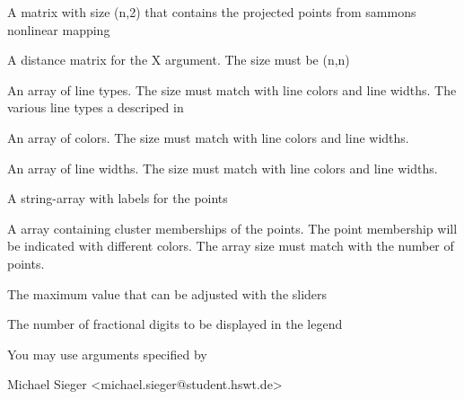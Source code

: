 \documentclass[letterpaper]{book}
\begin{document}
\begin{Arguments}
\begin{ldescription}
\item[\code{X}] 
A matrix with size (n,2) that contains the projected points from sammons nonlinear mapping

\item[\code{D}] 
A distance matrix for the X argument. The size must be (n,n)

\item[\code{linetypes}] 
An array of line types. The size must match with line colors and line widths.
The various line types a descriped in 

\item[\code{linecolors}] 
An array of colors. The size must match with line colors and line widths.

\item[\code{linewidths}] 
An array of line widths. The size must match with line colors and line widths.

\item[\code{labels}] 
A string-array with labels for the points

\item[\code{cluster}] 
A array containing cluster memberships of the points. The point
membership will be indicated with different colors. The array size
must match with the number of points.

\item[\code{maxValue}] 
The maximum value that can be adjusted with the sliders

\item[\code{legendDigits}] 
The number of fractional digits to be displayed in the legend

\item[\code{...}] 
You may use arguments specified by 

\end{ldescription}
\end{Arguments}
%
\begin{Author}\relax
Michael Sieger <michael.sieger@student.hswt.de>
\end{Author}
%
\end{document}
